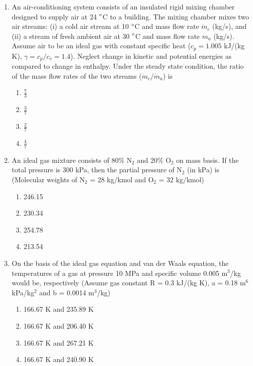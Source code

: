 \documentclass[a4paper,10pt]{article}
\begin{document}
\begin{enumerate}
\item An air-conditioning system consists of an insulated rigid mixing chamber designed to supply air at 24 $\degree$C to a building. The mixing chamber mixes two air streams: (i) a cold air stream at 10 $\degree$C and mass flow rate $\dot{m}_c$ (kg/s), and (ii) a stream of fresh ambient air at 30 $\degree$C and mass flow rate $\dot{m}_a$ (kg/s). Assume air to be an ideal gas with constant specific heat ($c_p = 1.005$ kJ/(kg K), $\gamma = c_p/c_v = 1.4$). Neglect change in kinetic and potential energies as compared to change in enthalpy. Under the steady state condition, the ratio of the mass flow rates of the two streams ($\dot{m}_c/\dot{m}_a$) is

\hfill{}
\begin{enumerate}
    \item $\frac{7}{3}$
    \item $\frac{3}{7}$
    \item $\frac{2}{7}$
    \item $\frac{4}{7}$
\end{enumerate}

\item An ideal gas mixture consists of 80\% N$_2$ and 20\% O$_2$ on mass basis. If the total pressure is 300 kPa, then the partial pressure of N$_2$ (in kPa) is (Molecular weights of N$_2$ = 28 kg/kmol and O$_2$ = 32 kg/kmol)

\hfill{}
\begin{enumerate}
    \item 246.15
    \item 230.34
    \item 254.78
    \item 213.54
\end{enumerate}

\item On the basis of the ideal gas equation and van der Waals equation, the temperatures of a gas at pressure 10 MPa and specific volume 0.005 m$^3$/kg would be, respectively (Assume gas constant R = 0.3 kJ/(kg K), a = 0.18 m$^6$ kPa/kg$^2$ and b = 0.0014 m$^3$/kg)

\hfill{}
\begin{enumerate}
    \item 166.67 K and 235.89 K
    \item 166.67 K and 206.40 K
    \item 166.67 K and 267.21 K
    \item 166.67 K and 240.90 K
\end{enumerate}


\end{enumerate}
\end{document}
